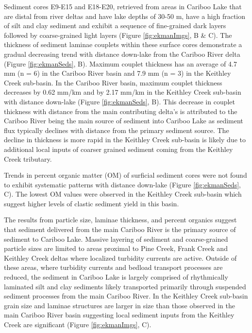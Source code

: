 \documentclass[Royal,times,doublespace,sageh]{sagej}
\begin{document}
Sediment cores E9-E15 and E18-E20, retrieved from areas in Cariboo Lake
that are distal from river deltas and have lake depths of 30-50 m, have
a high fraction of silt and clay sediment and exhibit a sequence of
fine-grained dark layers followed by coarse-grained light layers (Figure
\ref{fig:ekmanImgs}, B \& C). The thickness of sediment laminae couplets
within these surface cores demonstrate a gradual decreasing trend with
distance down-lake from the Cariboo River delta (Figure
\ref{fig:ekmanSeds}, B). Maximum couplet thickness has an average of 4.7
mm (n = 6) in the Cariboo River basin and 7.9 mm (n = 3) in the Keithley
Creek sub-basin. In the Cariboo River basin, maximum couplet thickness
decreases by 0.62 mm/km and by 2.17 mm/km in the Keithley Creek
sub-basin with distance down-lake (Figure \ref{fig:ekmanSeds}, B). This
decrease in couplet thickness with distance from the main contributing
delta's is attributed to the Cariboo River being the main source of
sediment into Cariboo Lake as sediment flux typically declines with
distance from the primary sediment source. The decline in thickness is
more rapid in the Keithley Creek sub-basin is likely due to additional
local inputs of coarser grained sediment coming from the Keithley Creek
tributary.

Trends in percent organic matter (OM) of surficial sediment cores were
not found to exhibit systematic patterns with distance down-lake (Figure
\ref{fig:ekmanSeds}, C). The lowest OM values were observed in the
Keithley Creek sub-basin which suggest higher levels of clastic sediment
yield in this basin.

The results from particle size, laminae thickness, and percent organics
suggest that sediment delivered from the main Cariboo River is the
primary source of sediment to Cariboo Lake. Massive layering of sediment
and coarse-grained particle sizes are limited to areas proximal to Pine
Creek, Frank Creek and Keithley Creek deltas where localized turbidity
currents are active. Outside of these areas, where turbidity currents
and bedload transport processes are reduced, the sediment in Cariboo
Lake is largely comprised of rhythmically laminated silt and clay
sediments likely transported primarily through suspended sediment
processes from the main Cariboo River. In the Keithley Creek sub-basin
grain size and laminae structures are larger in size than those observed
in the main Cariboo River basin suggesting local sediment inputs from
the Keithley Creek are significant (Figure \ref{fig:ekmanImgs}, C).
\end{document}
